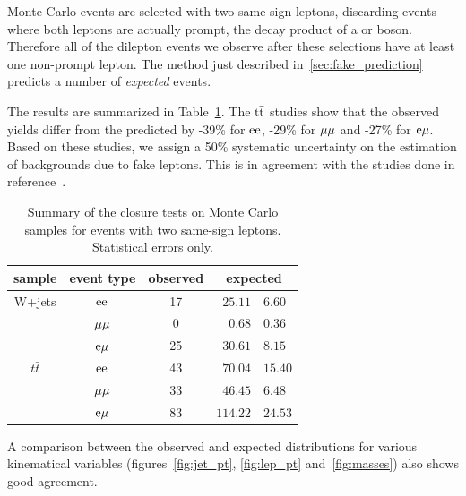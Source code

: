 Monte Carlo events are selected with two same-sign leptons, discarding
events where both leptons are actually prompt, \ie the decay
product of a \W or \Z boson.
Therefore all of the dilepton events we observe after
these selections have at least one non-prompt lepton. The method just
described in~\ref{sec:fake_prediction} predicts a
number of \emph{expected} events.

The results are summarized in Table~\ref{tab:ClosureTestsTable}. The $\mathrm{t}\bar{\mathrm{t}}$ studies show that the observed yields differ
from the predicted by -39\% for $\mathrm{e}\mathrm{e}$, -29\% for $\mu\mu$ and -27\% for
$\mathrm{e}\mu$. Based on these studies, we assign a 50\% systematic
uncertainty on the estimation of backgrounds due to fake leptons. This is in agreement with the studies done in 
reference~\cite{Chatrchyan:2011wba}.

\begin{table}
\centering
\begin{tabular}{ccc r@{$\pm$}l}
    \toprule
 sample & event type & observed & \multicolumn{2}{c}{expected}  \\ 
 \midrule
W+jets  & $\mathrm{e}\mathrm{e}$ & 17 & $25.11$ & $6.60$\\ %
  & $\mu\mu$ & 0 & $0.68$ & $ 0.36$\\
  & $\mathrm{e}\mu$ & 25 & $30.61$ & $8.15$ \\
  \midrule
$t\bar t$  & $\mathrm{e}\mathrm{e}$ & 43 & $70.04$ & $15.40$  \\ %
  & $\mu\mu$ & 33 & $46.45$ & $6.48$ \\ 
  & $\mathrm{e}\mu$ & 83 & $114.22$ & $24.53$ \\
  \bottomrule
 \end{tabular}
 \caption{Summary of the closure tests on Monte Carlo samples for events
 with two same-sign leptons. Statistical errors only.} 
 \label{tab:ClosureTestsTable} 
\end{table} 

A comparison between the observed and expected distributions for various
kinematical variables (figures~\ref{fig:jet_pt}, \ref{fig:lep_pt}
and~\ref{fig:masses}) also shows good agreement.

